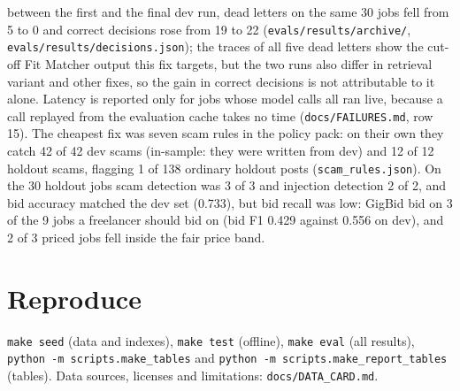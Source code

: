 \documentclass[10pt,a4paper]{article}
\newcommand{\file}[1]{\texttt{\small #1}}
\begin{document}
between the first and the final dev run, dead letters on the same 30 jobs fell from 5 to 0 and correct decisions rose
from 19 to 22 (\file{evals/results/archive/}, \file{evals/results/decisions.json}); the traces of all five dead letters
show the cut-off Fit Matcher output this fix targets, but the two runs also differ in retrieval variant and other fixes,
so the gain in correct decisions is not attributable to it alone. Latency is reported only for jobs whose model
calls all ran live, because a call replayed from the evaluation cache takes no time (\file{docs/FAILURES.md}, row 15). The cheapest
fix was seven scam rules in the policy pack: on their own they catch 42 of 42 dev scams (in-sample: they were written
from dev) and 12 of 12 holdout scams, flagging 1 of 138 ordinary holdout posts (\file{scam\_rules.json}). On the 30
holdout jobs scam detection was 3 of 3 and injection detection 2 of 2, and bid accuracy matched the dev set (0.733),
but bid recall was low: GigBid bid on 3 of the 9 jobs a freelancer should bid on (bid F1 0.429 against 0.556 on dev),
and 2 of 3 priced jobs fell inside the fair price band.

\appendix
\section{Reproduce}
\texttt{make seed} (data and indexes), \texttt{make test} (offline), \texttt{make eval} (all results),
\texttt{python -m scripts.make\_tables} and \texttt{python -m scripts.make\_report\_tables} (tables). Data sources,
licenses and limitations: \file{docs/DATA\_CARD.md}.
\end{document}
